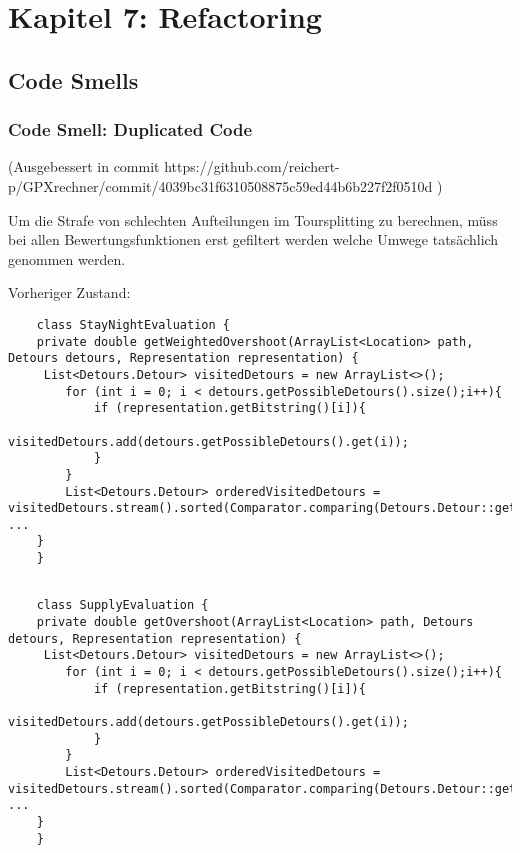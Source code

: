 \section{Kapitel 7: Refactoring}

\subsection{Code Smells}

\subsubsection{Code Smell: Duplicated Code}

(Ausgebessert in commit https://github.com/reichert-p/GPXrechner/commit/4039bc31f6310508875c59ed44b6b227f2f0510d )

Um die Strafe von schlechten Aufteilungen im Toursplitting zu berechnen, müss bei allen Bewertungsfunktionen erst gefiltert werden welche Umwege tatsächlich genommen werden.

Vorheriger Zustand:

\begin{lstlisting}
	class StayNightEvaluation {
	private double getWeightedOvershoot(ArrayList<Location> path, Detours detours, Representation representation) {
	 List<Detours.Detour> visitedDetours = new ArrayList<>();
        for (int i = 0; i < detours.getPossibleDetours().size();i++){
            if (representation.getBitstring()[i]){
                visitedDetours.add(detours.getPossibleDetours().get(i));
            }
        }
        List<Detours.Detour> orderedVisitedDetours = visitedDetours.stream().sorted(Comparator.comparing(Detours.Detour::getPosition)).toList();
...	
	}
	}
\end{lstlisting}

\begin{lstlisting}

	class SupplyEvaluation {
	private double getOvershoot(ArrayList<Location> path, Detours detours, Representation representation) {
	 List<Detours.Detour> visitedDetours = new ArrayList<>();
        for (int i = 0; i < detours.getPossibleDetours().size();i++){
            if (representation.getBitstring()[i]){
                visitedDetours.add(detours.getPossibleDetours().get(i));
            }
        }
        List<Detours.Detour> orderedVisitedDetours = visitedDetours.stream().sorted(Comparator.comparing(Detours.Detour::getPosition)).toList();
...	
	}
	}


\end{lstlisting}

